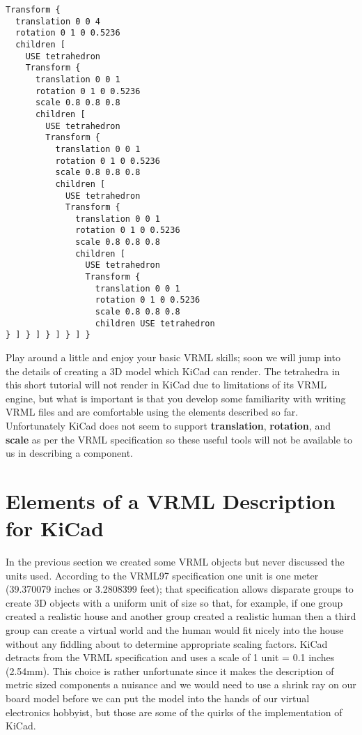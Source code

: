\documentclass[a4paper]{article}
\begin{document}
\begin{verbatim}
Transform {
  translation 0 0 4
  rotation 0 1 0 0.5236
  children [
    USE tetrahedron
    Transform {
      translation 0 0 1
      rotation 0 1 0 0.5236
      scale 0.8 0.8 0.8
      children [
        USE tetrahedron
        Transform {
          translation 0 0 1
          rotation 0 1 0 0.5236
          scale 0.8 0.8 0.8
          children [
            USE tetrahedron
            Transform {
              translation 0 0 1
              rotation 0 1 0 0.5236
              scale 0.8 0.8 0.8
              children [
                USE tetrahedron
                Transform {
                  translation 0 0 1
                  rotation 0 1 0 0.5236
                  scale 0.8 0.8 0.8
                  children USE tetrahedron
} ] } ] } ] } ] }
\end{verbatim}

Play around a little and enjoy your basic VRML skills; soon we will jump into the details of creating a
3D model which KiCad can render. The tetrahedra in this short tutorial will not render in KiCad due to
limitations of its VRML engine, but what is important is that you develop some familiarity with writing
VRML files and are comfortable using the elements described so far. Unfortunately KiCad does not seem to
support \textbf{translation}, \textbf{rotation}, and \textbf{scale} as per the VRML specification so these
useful tools will not be available to us in describing a component.

\section{Elements of a VRML Description for KiCad}
In the previous section we created some VRML objects but never discussed the units used. According to the VRML97
specification one unit is one meter (39.370079 inches or 3.2808399 feet); that specification allows disparate
groups to create 3D objects with a uniform unit of size so that, for example, if one group created a realistic
house and another group created a realistic human then a third group can create a virtual world and the human
would fit nicely into the house without any fiddling about to determine appropriate scaling factors. KiCad
detracts from the VRML specification and uses a scale of 1 unit = 0.1 inches (2.54mm). This choice is rather
unfortunate since it makes the description of metric sized components a nuisance and we would need to use a
shrink ray on our board model before we can put the model into the hands of our virtual electronics hobbyist,
but those are some of the quirks of the implementation of KiCad.
\end{document}
